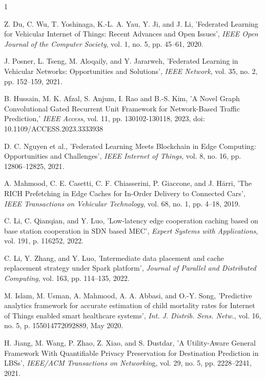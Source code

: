 \documentclass[journal]{IEEEtran}
\begin{document}
\begin{thebibliography}{1}


Z. Du, C. Wu, T. Yoshinaga, K.-L. A. Yau, Y. Ji, and J. Li, 'Federated Learning for Vehicular Internet of Things: Recent Advances and Open Issues', \textit{IEEE Open Journal of the Computer Society}, vol. 1, no. 5, pp. 45–61, 2020.

J. Posner, L. Tseng, M. Aloqaily, and Y. Jararweh, 'Federated Learning in Vehicular Networks: Opportunities and Solutions', \textit{IEEE Network}, vol. 35, no. 2, pp. 152–159, 2021.

 B. Hussain, M. K. Afzal, S. Anjum, I. Rao and B.-S. Kim, 'A Novel Graph Convolutional Gated Recurrent Unit Framework for Network-Based Traffic Prediction,' \textit{IEEE Access}, vol. 11, pp. 130102-130118, 2023, doi: 10.1109/ACCESS.2023.3333938 

D. C. Nguyen et al., 'Federated Learning Meets Blockchain in Edge Computing: Opportunities and Challenges', \textit{IEEE Internet of Things}, vol. 8, no. 16, pp. 12806–12825, 2021.

A. Mahmood, C. E. Casetti, C. F. Chiasserini, P. Giaccone, and J. Härri, 'The RICH Prefetching in Edge Caches for In-Order Delivery to Connected Cars', \textit{IEEE Transactions on Vehicular Technology}, vol. 68, no. 1, pp. 4–18, 2019.


C. Li, C. Qianqian, and Y. Luo, 'Low-latency edge cooperation caching based on base station cooperation in SDN based MEC', \textit{Expert Systems with Applications}, vol. 191, p. 116252, 2022.

C. Li, Y. Zhang, and Y. Luo, 'Intermediate data placement and cache replacement strategy under Spark platform', \textit{Journal of Parallel and Distributed Computing}, vol. 163, pp. 114–135, 2022.

M. Islam, M. Usman, A. Mahmood, A. A. Abbasi, and O.-Y. Song, 'Predictive analytics framework for accurate estimation of child mortality rates for Internet of Things enabled smart healthcare systems', \textit{Int. J. Distrib. Sens. Netw.}, vol. 16, no. 5, p. 155014772092889, May 2020.

H. Jiang, M. Wang, P. Zhao, Z. Xiao, and S. Dustdar, 'A Utility-Aware General Framework With Quantifiable Privacy Preservation for Destination Prediction in LBSs', \textit{IEEE/ACM Transactions on Networkin}g, vol. 29, no. 5, pp. 2228–2241, 2021.



\end{thebibliography}
\end{document}
